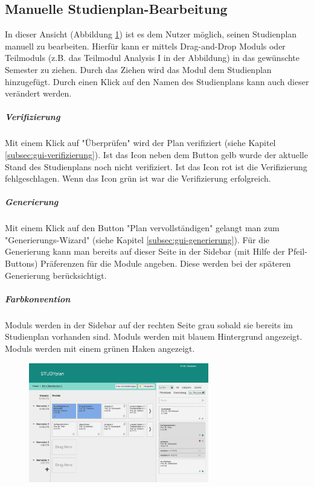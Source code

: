 \subsection{Manuelle Studienplan-Bearbeitung}
\label{subsec:gui-manuelle-bearbeitung}
In dieser Ansicht (Abbildung \ref{fig:gui-bearbeitung-1}) ist es dem Nutzer möglich, seinen \gls{Studienplan} manuell zu bearbeiten. Hierfür kann er mittels \gls{Drag-and-Drop} \glspl{Modul} oder \glspl{Teilmodul} (z.B. das \gls{Teilmodul} Analysis I in der Abbildung) in das gewünschte Semester zu ziehen. Durch das Ziehen wird das \gls{Modul} dem \gls{Studienplan} hinzugefügt. Durch einen Klick auf den Namen des \gls{Studienplan}s kann auch dieser verändert werden.
\subparagraph{Verifizierung}
Mit einem Klick auf "Überprüfen" wird der Plan verifiziert (siehe Kapitel \ref{subsec:gui-verifizierung}).\newline
Ist das Icon neben dem Button gelb wurde der aktuelle Stand des \gls{Studienplan}s noch nicht verifiziert. Ist das Icon rot ist die Verifizierung fehlgeschlagen. Wenn das Icon grün ist war die Verifizierung erfolgreich.
\subparagraph{Generierung}
Mit einem Klick auf den Button "Plan vervollständigen" gelangt man zum "Generierungs-Wizard" (siehe Kapitel \ref{subsec:gui-generierung}). Für die Generierung kann man bereits auf dieser Seite in der Sidebar (mit Hilfe der Pfeil-Buttons) Präferenzen für die Module angeben. Diese werden bei der späteren Generierung berücksichtigt.
\subparagraph{Farbkonvention}
\glspl{Modul} werden in der Sidebar auf der rechten Seite grau sobald sie bereits im \gls{Studienplan} vorhanden sind.\newline
{} \glspl{Modul} werden mit blauem Hintergrund angezeigt.
 \glspl{Modul} werden mit einem grünen Haken angezeigt.
\begin{figure}[!htb]
	\caption{}
	\label{fig:gui-bearbeitung-1}
	\centering
	\includegraphics[width=0.7\textwidth]{../GUI/ergebnisse/bearbeitung-1.png}
\end{figure}

